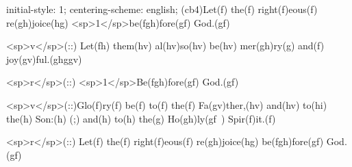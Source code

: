 initial-style: 1;
centering-scheme: english;
(cb4)Let(f) the(f) right(f)eous(f) re(gh)joice(hg) <sp>1</sp>be(fgh)fore(gf) God.(gf)

<sp>v</sp>(::) Let(fh) them(hv) al(hv)so(hv) be(hv) mer(gh)ry(g) and(f) joy(gv)ful.(ghggv)

<sp>r</sp>(::) <sp>1</sp>Be(fgh)fore(gf) God.(gf)

<sp>v</sp>(::)Glo(f)ry(f) be(f) to(f) the(f) Fa(gv)ther,(hv) and(hv) to(hi) the(h) Son:(h) (;) and(h) to(h) the(g) Ho(gh)ly(gf~) Spir(f)it.(f)

<sp>r</sp>(::) Let(f) the(f) right(f)eous(f) re(gh)joice(hg) be(fgh)fore(gf) God.(gf)